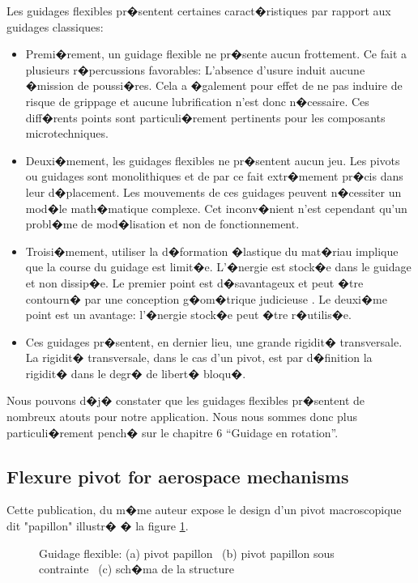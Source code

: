Les guidages flexibles pr�sentent certaines caract�ristiques par rapport aux guidages classiques:
\begin{itemize}
\item Premi�rement, un guidage flexible ne pr�sente aucun frottement. Ce fait a plusieurs r�percussions favorables: L'absence d'usure induit aucune �mission de poussi�res. Cela a �galement pour effet de ne pas induire de risque de grippage et aucune lubrification n'est donc n�cessaire. Ces diff�rents points sont particuli�rement pertinents pour les composants microtechniques.

\item Deuxi�mement, les guidages flexibles ne pr�sentent aucun jeu. Les pivots ou guidages sont monolithiques et de par ce fait extr�mement pr�cis dans leur d�placement. Les mouvements de ces guidages peuvent n�cessiter un mod�le math�matique complexe. Cet inconv�nient n'est cependant qu'un probl�me de mod�lisation et non de fonctionnement.

\item Troisi�mement, utiliser la d�formation �lastique du mat�riau implique que la course du guidage est limit�e. L'�nergie est stock�e dans le guidage et non dissip�e. Le premier point est d�savantageux et peut �tre contourn� par une conception g�om�trique judicieuse \cite{henein}. Le deuxi�me point est un avantage: l'�nergie stock�e peut �tre r�utilis�e.

\item Ces guidages pr�sentent, en dernier lieu, une grande rigidit� transversale. La rigidit� transversale, dans le cas d'un pivot,  est par d�finition la rigidit� dans le degr� de libert� bloqu�.
\end{itemize}

\noindent Nous pouvons d�j� constater que les guidages flexibles pr�sentent de nombreux atouts pour notre application. Nous nous sommes donc plus particuli�rement pench� sur le chapitre 6 ``Guidage en rotation''.



\subsection{Flexure pivot for aerospace mechanisms \cite{henein}}

Cette publication, du m�me auteur expose le design d'un pivot macroscopique dit "papillon" illustr� � la figure \ref{fig: mix_pivot_pap}.

\begin{figure}[!ht]
\centering
\caption{Guidage flexible: (a) pivot papillon \ (b) pivot papillon sous contrainte \ (c) sch�ma de la structure}
\label{fig: mix_pivot_pap}
\end{figure}

